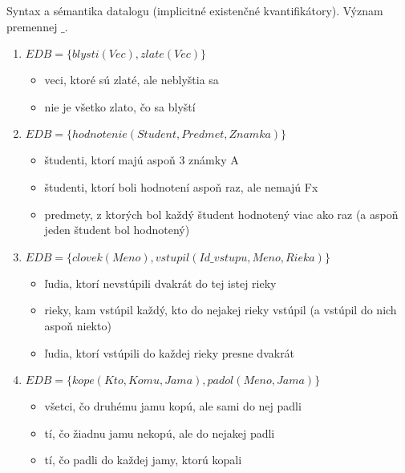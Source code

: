 \documentclass[10pt, a4paper]{article}
\begin{document}
% 

Syntax a sémantika datalogu (implicitné existenčné kvantifikátory). Význam premennej $\_$.

\begin{enumerate}
\item
$EDB = \{blysti(Vec), zlate(Vec)\}$
\begin{itemize}
    \item veci, ktoré sú zlaté, ale neblyštia sa
    \item nie je všetko zlato, čo sa blyští    
\end{itemize}

\item
$EDB=\{hodnotenie(Student, Predmet, Znamka)\}$
\begin{itemize}
    \item študenti, ktorí majú aspoň 3 známky A
    \item študenti, ktorí boli hodnotení aspoň raz, ale nemajú Fx
    \item predmety, z ktorých bol každý študent hodnotený viac ako raz (a aspoň jeden študent bol hodnotený)
\end{itemize}

\item
$EDB = \{clovek(Meno), vstupil(Id\_vstupu, Meno, Rieka)\}$
\begin{itemize}
    \item ľudia, ktorí nevstúpili dvakrát do tej istej rieky
    \item rieky, kam vstúpil každý, kto do nejakej rieky vstúpil (a vstúpil do nich aspoň niekto)
    \item ľudia, ktorí vstúpili do každej rieky presne dvakrát
\end{itemize}

\item
$EDB = \{kope(Kto, Komu, Jama), padol(Meno, Jama)\}$
\begin{itemize}
    \item všetci, čo druhému jamu kopú, ale sami do nej padli
    \item tí, čo žiadnu jamu nekopú, ale do nejakej padli
    \item tí, čo padli do každej jamy, ktorú kopali
\end{itemize}


\end{enumerate}
\end{document}
